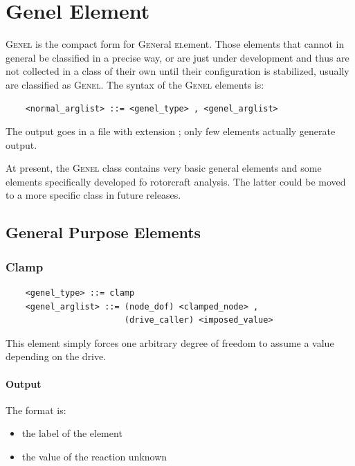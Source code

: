 




\section{Genel Element}
\label{sec:EL:GENEL}
\textsc{Genel} is the compact form for \textsc{Gen}eral \textsc{el}ement.
Those elements that cannot in general be classified in a precise way, 
or are just under development and thus are not collected in a class 
of their own until their configuration is stabilized, usually are
classified as \textsc{Genel}.
The syntax of the \textsc{Genel} elements is:
\begin{verbatim}
    <normal_arglist> ::= <genel_type> , <genel_arglist>
\end{verbatim}

\noindent
The output goes in a file with extension ; only few elements
actually generate output.

\noindent
At present, the \textsc{Genel} class contains very basic general elements
and some elements specifically developed fo rotorcraft analysis.
The latter could be moved to a more specific class in future releases.

\subsection{General Purpose Elements}
   
\subsubsection{Clamp}
\label{sec:EL:GENEL:CLAMP}
\begin{verbatim}
    <genel_type> ::= clamp
    <genel_arglist> ::= (node_dof) <clamped_node> ,
                        (drive_caller) <imposed_value>
\end{verbatim}
This element simply forces one arbitrary degree of freedom to assume a value
depending on the drive.

\paragraph{Output}
The format is:
\begin{itemize}
    \item the label of the element
    \item the value of the reaction unknown
\end{itemize}
  
